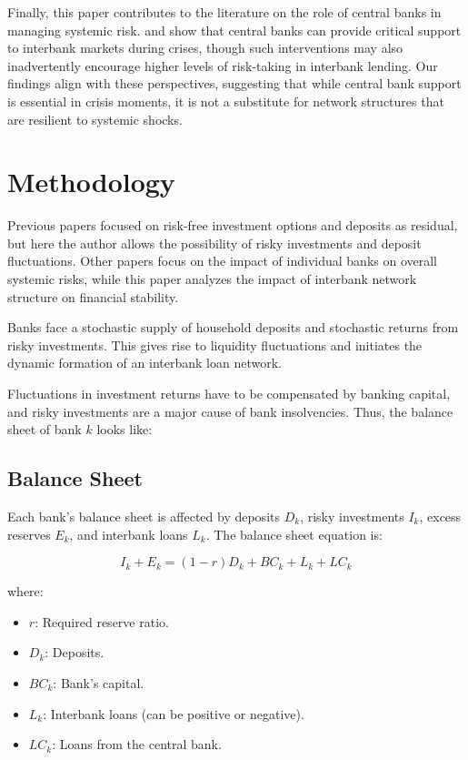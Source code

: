 \documentclass{article} %
\begin{document}
Finally, this paper contributes to the literature on the role of central banks in managing systemic risk. \cite{allen2009interbank} and \cite{freixas2010bank} show that central banks can provide critical support to interbank markets during crises, though such interventions may also inadvertently encourage higher levels of risk-taking in interbank lending. Our findings align with these perspectives, suggesting that while central bank support is essential in crisis moments, it is not a substitute for network structures that are resilient to systemic shocks.

\section{Methodology}
Previous papers focused on risk-free investment options and deposits as residual, but here the author allows the possibility of risky investments and deposit fluctuations. Other papers focus on the impact of individual banks on overall systemic risks, while this paper analyzes the impact of interbank network structure on financial stability.

Banks face a stochastic supply of household deposits and stochastic returns from risky investments. This gives rise to liquidity fluctuations and initiates the dynamic formation of an interbank loan network.

Fluctuations in investment returns have to be compensated by banking capital, and risky investments are a major cause of bank insolvencies. Thus, the balance sheet of bank \( k \) looks like:

\subsection{Balance Sheet}

Each bank’s balance sheet is affected by deposits \( D_k \), risky investments \( I_k \), excess reserves \( E_k \), and interbank loans \( L_k \). The balance sheet equation is:

\[
I_k + E_k = (1 - r) D_k + BC_k + L_k + LC_k
\]

where:
\begin{itemize}
    \item \( r \): Required reserve ratio.
    \item \( D_k \): Deposits.
    \item \( BC_k \): Bank’s capital.
    \item \( L_k \): Interbank loans (can be positive or negative).
    \item \( LC_k \): Loans from the central bank.
\end{itemize}
\end{document}
